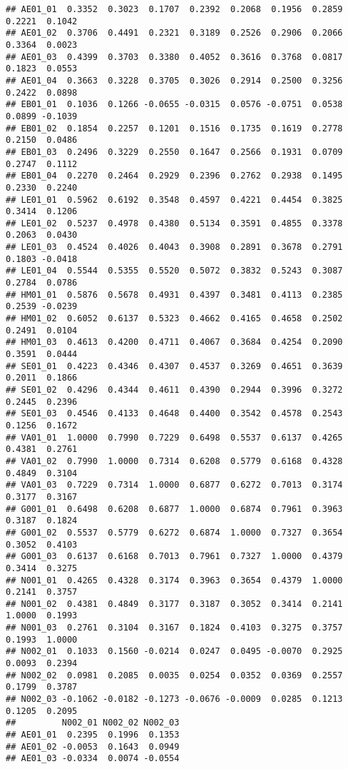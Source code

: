 \documentclass[
]{article}
\begin{document}
\begin{verbatim}
## AE01_01  0.3352  0.3023  0.1707  0.2392  0.2068  0.1956  0.2859  0.2221  0.1042
## AE01_02  0.3706  0.4491  0.2321  0.3189  0.2526  0.2906  0.2066  0.3364  0.0023
## AE01_03  0.4399  0.3703  0.3380  0.4052  0.3616  0.3768  0.0817  0.1823  0.0553
## AE01_04  0.3663  0.3228  0.3705  0.3026  0.2914  0.2500  0.3256  0.2422  0.0898
## EB01_01  0.1036  0.1266 -0.0655 -0.0315  0.0576 -0.0751  0.0538  0.0899 -0.1039
## EB01_02  0.1854  0.2257  0.1201  0.1516  0.1735  0.1619  0.2778  0.2150  0.0486
## EB01_03  0.2496  0.3229  0.2550  0.1647  0.2566  0.1931  0.0709  0.2747  0.1112
## EB01_04  0.2270  0.2464  0.2929  0.2396  0.2762  0.2938  0.1495  0.2330  0.2240
## LE01_01  0.5962  0.6192  0.3548  0.4597  0.4221  0.4454  0.3825  0.3414  0.1206
## LE01_02  0.5237  0.4978  0.4380  0.5134  0.3591  0.4855  0.3378  0.2063  0.0430
## LE01_03  0.4524  0.4026  0.4043  0.3908  0.2891  0.3678  0.2791  0.1803 -0.0418
## LE01_04  0.5544  0.5355  0.5520  0.5072  0.3832  0.5243  0.3087  0.2784  0.0786
## HM01_01  0.5876  0.5678  0.4931  0.4397  0.3481  0.4113  0.2385  0.2539 -0.0239
## HM01_02  0.6052  0.6137  0.5323  0.4662  0.4165  0.4658  0.2502  0.2491  0.0104
## HM01_03  0.4613  0.4200  0.4711  0.4067  0.3684  0.4254  0.2090  0.3591  0.0444
## SE01_01  0.4223  0.4346  0.4307  0.4537  0.3269  0.4651  0.3639  0.2011  0.1866
## SE01_02  0.4296  0.4344  0.4611  0.4390  0.2944  0.3996  0.3272  0.2445  0.2396
## SE01_03  0.4546  0.4133  0.4648  0.4400  0.3542  0.4578  0.2543  0.1256  0.1672
## VA01_01  1.0000  0.7990  0.7229  0.6498  0.5537  0.6137  0.4265  0.4381  0.2761
## VA01_02  0.7990  1.0000  0.7314  0.6208  0.5779  0.6168  0.4328  0.4849  0.3104
## VA01_03  0.7229  0.7314  1.0000  0.6877  0.6272  0.7013  0.3174  0.3177  0.3167
## G001_01  0.6498  0.6208  0.6877  1.0000  0.6874  0.7961  0.3963  0.3187  0.1824
## G001_02  0.5537  0.5779  0.6272  0.6874  1.0000  0.7327  0.3654  0.3052  0.4103
## G001_03  0.6137  0.6168  0.7013  0.7961  0.7327  1.0000  0.4379  0.3414  0.3275
## N001_01  0.4265  0.4328  0.3174  0.3963  0.3654  0.4379  1.0000  0.2141  0.3757
## N001_02  0.4381  0.4849  0.3177  0.3187  0.3052  0.3414  0.2141  1.0000  0.1993
## N001_03  0.2761  0.3104  0.3167  0.1824  0.4103  0.3275  0.3757  0.1993  1.0000
## N002_01  0.1033  0.1560 -0.0214  0.0247  0.0495 -0.0070  0.2925  0.0093  0.2394
## N002_02  0.0981  0.2085  0.0035  0.0254  0.0352  0.0369  0.2557  0.1799  0.3787
## N002_03 -0.1062 -0.0182 -0.1273 -0.0676 -0.0009  0.0285  0.1213  0.1205  0.2095
##         N002_01 N002_02 N002_03
## AE01_01  0.2395  0.1996  0.1353
## AE01_02 -0.0053  0.1643  0.0949
## AE01_03 -0.0334  0.0074 -0.0554

\end{verbatim}
\end{document}
